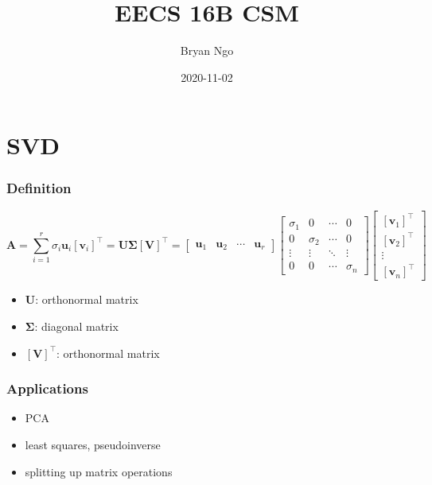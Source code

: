 \documentclass[aspectratio=169]{beamer}
\title{EECS 16B CSM}
\author{Bryan Ngo}
\date{2020-11-02}
\institute{UC Berkeley}
\newcommand{\tpose}[1]{\left[#1\right]^{\! \top} \!\!}
\begin{document}
\begin{frame}
    \maketitle
\end{frame}

\section{SVD}

\begin{frame}
    \frametitle{Definition}

    \begin{equation}
        \bm{A} = \sum_{i = 1}^r \sigma_i \bm{u}_i \tpose{\bm{v}_i} = \bm{U \Sigma} \tpose{\bm{V}} =
        \begin{bmatrix}
            \bm{u}_1 & \bm{u}_2 & \cdots & \bm{u}_r
        \end{bmatrix}
        \begin{bmatrix}
            \sigma_1 & 0 & \cdots & 0 \\
            0 & \sigma_2 & \cdots & 0 \\
            \vdots & \vdots & \ddots & \vdots \\
            0 & 0 & \cdots & \sigma_n
        \end{bmatrix}
        \begin{bmatrix}
            \tpose{\bm{v}_1} \\
            \tpose{\bm{v}_2} \\
            \vdots \\
            \tpose{\bm{v}_n}
        \end{bmatrix}
    \end{equation}
    \begin{itemize}
        \item \(\bm{U}\): orthonormal matrix
        \item \(\bm{\Sigma}\): diagonal matrix
        \item \(\tpose{\bm{V}}\): orthonormal matrix
    \end{itemize}
\end{frame}

\begin{frame}
    \frametitle{Applications}

    \begin{itemize}
        \item PCA
        \item least squares, pseudoinverse
        \item splitting up matrix operations
    \end{itemize}
\end{frame}
\end{document}

